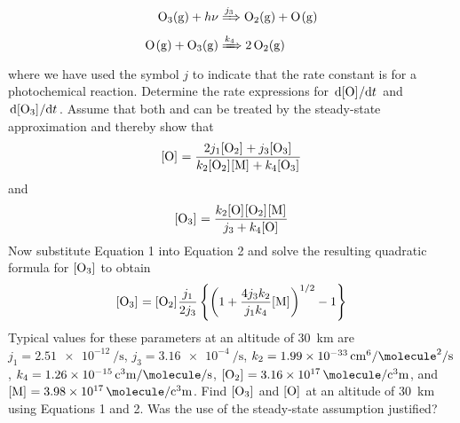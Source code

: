 \documentclass[../psets.tex]{subfiles}
\begin{document}
\begin{enumerate}[label={\textbf{29-\arabic*.}},leftmargin=3.5em]
\begin{align*}
        \ce{O3(g) + $h\nu$} &\xRightarrow{j_3} \ce{O2(g) + O(g)}\\
        \ce{O(g) + O3(g)} &\xRightarrow{k_4} \ce{2O2(g)}
    \end{align*}
    where we have used the symbol $j$ to indicate that the rate constant is for a photochemical reaction. Determine the rate expressions for $\dv*{\cnc{O}}{t}$ and $\dv*{\cnc{O3}}{t}$. Assume that both  and  can be treated by the steady-state approximation and thereby show that
    \begin{equation}
        \cnc{O} = \frac{2j_1\cnc{O2}+j_3\cnc{O3}}{k_2\cnc{O2}\cnc{M}+k_4\cnc{O3}}
    \end{equation}
    and
    \begin{equation}
        \cnc{O3} = \frac{k_2\cnc{O}\cnc{O2}\cnc{M}}{j_3+k_4\cnc{O}}
    \end{equation}
    Now substitute Equation 1 into Equation 2 and solve the resulting quadratic formula for $\cnc{O3}$ to obtain
    \begin{equation*}
        \cnc{O3} = \cnc{O2}\frac{j_1}{2j_3}\left\{ \left( 1+\frac{4j_3k_2}{j_1k_4}\cnc{M} \right)^{1/2}-1 \right\}
    \end{equation*}
    Typical values for these parameters at an altitude of \SI{30}{\kilo\meter} are $j_1=\SI{2.51e-12}{\per\second}$, $j_3=\SI{3.16e-4}{\per\second}$, $k_2=\SI{1.99e-33}{\centi\meter\tothe{6}\per\square\molecule\per\second}$, $k_4=\SI{1.26e-15}{\cubic\centi\meter\per\molecule\per\second}$, $\cnc{O2}=\SI{3.16e17}{\molecule\per\cubic\centi\meter}$, and $\cnc{M}=\SI{3.98e17}{\molecule\per\cubic\centi\meter}$. Find $\cnc{O3}$ and $\cnc{O}$ at an altitude of \SI{30}{\kilo\meter} using Equations 1 and 2. Was the use of the steady-state assumption justified?
\end{enumerate}
\end{document}
